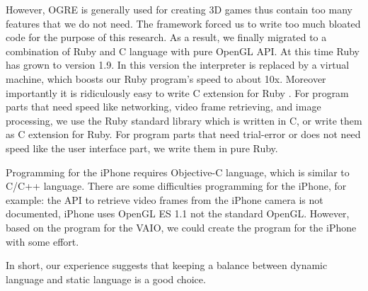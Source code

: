 However, OGRE is generally used for creating 3D games thus contain too many features that we do not need. The framework forced us to write too much bloated code for the purpose of this research. As a result, we finally migrated to a combination of Ruby and C language with pure OpenGL API. At this time Ruby has grown to version 1.9. In this version the interpreter is replaced by a virtual machine, which boosts our Ruby program's speed to about 10x. Moreover importantly it is ridiculously easy to write C extension for Ruby \cite{Reference15}. For program parts that need speed like networking, video frame retrieving, and image processing, we use the Ruby standard library which is written in C, or write them as C extension for Ruby. For program parts that need trial-error or does not need speed like the user interface part, we write them in pure Ruby.

Programming for the iPhone requires Objective-C language, which is similar to C/C++ language. There are some difficulties programming for the iPhone, for example: the API to retrieve video frames from the iPhone camera is not documented, iPhone uses OpenGL ES 1.1 not the standard OpenGL. However, based on the program for the VAIO, we could create the program for the iPhone with some effort.

In short, our experience suggests that keeping a balance between dynamic language and static language is a good choice.
